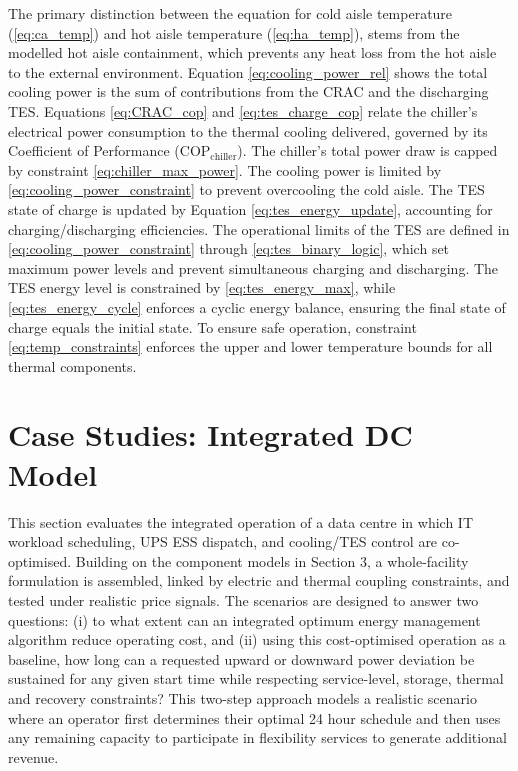 \documentclass[lettersize,journal]{IEEEtran}
\newcommand{\rev}[1]{\textcolor{blue!70!black}{#1}}
\begin{document}
The primary distinction between the equation for cold aisle temperature (\ref{eq:ca_temp}) and hot aisle temperature (\ref{eq:ha_temp}), stems from the modelled hot aisle containment, which prevents any heat loss from the hot aisle to the external environment. Equation \eqref{eq:cooling_power_rel} shows the total cooling power is the sum of contributions from the CRAC and the discharging TES. Equations \eqref{eq:CRAC_cop} and \eqref{eq:tes_charge_cop} relate the chiller's electrical power consumption to the thermal cooling delivered, governed by its Coefficient of Performance ($\mathrm{COP}_{\mathrm{chiller}}$). The chiller's total power draw is capped by constraint \eqref{eq:chiller_max_power}. The cooling power is limited by \eqref{eq:cooling_power_constraint} to prevent overcooling the cold aisle. The TES state of charge is updated by Equation \eqref{eq:tes_energy_update}, accounting for charging/discharging efficiencies. The operational limits of the TES are defined in \eqref{eq:cooling_power_constraint} through \eqref{eq:tes_binary_logic}, which set maximum power levels and prevent simultaneous charging and discharging. The TES energy level is constrained by \eqref{eq:tes_energy_max}, while \eqref{eq:tes_energy_cycle} enforces a cyclic energy balance, ensuring the final state of charge equals the initial state.
To ensure safe operation, constraint \eqref{eq:temp_constraints} enforces the upper and lower temperature bounds for all thermal components.
 

\section{Case Studies: Integrated DC Model}\label{sec:integrated_model and case studies}

This section evaluates the integrated operation of a data centre  in which IT workload scheduling, UPS ESS dispatch, and cooling/TES control are co-optimised. Building on the component models in Section 3, a whole-facility formulation is assembled, linked by electric and thermal coupling constraints, and tested under realistic price signals. The scenarios are designed to answer two questions: (i) to what extent can an integrated optimum energy management algorithm reduce operating cost, and \rev{(ii) using this cost-optimised operation as a baseline, how long can a requested upward or downward power deviation be sustained for any given start time while respecting service-level, storage, thermal and recovery constraints?} This two-step approach models a realistic scenario where an operator first determines their optimal 24 hour schedule and then uses any remaining capacity to participate in flexibility services to generate additional revenue.
\end{document}
